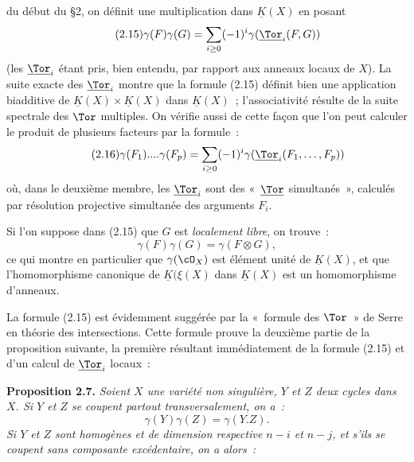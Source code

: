 du début du \S 2, on
définit une multiplication dans $\underline{K}(X)$ en posant
\begin{equation}\tag{2.15}
 \gamma(F)\gamma(G)=\sum_{i\geq0}(-1)^i\gamma(\underline{\Tor}_i(F,G))
\end{equation}
(les $\underline{\Tor}_i$ étant pris, bien entendu, par rapport aux anneaux locaux de $X$). La suite exacte des $\underline{\Tor}_i$ montre que la formule (2.15) définit bien une application biadditive de $\underline{K}(X)\times\underline{K}(X)$ dans $\underline{K}(X)$~; l'associativité résulte de la suite spectrale des $\Tor$ multiples. On vérifie aussi de cette façon que l'on peut calculer le produit de plusieurs facteurs par la formule~:
\begin{equation}\tag{2.16}
 \gamma(F_1)....\gamma(F_p)=\sum_{i\geq0}(-1)^i\gamma(\underline{\Tor}_i(F_1,\ldots,F_p))
\end{equation}
où, dans le deuxième membre, les $\underline{\Tor}_i$ sont des «~$\underline{\Tor}$ simultanés~», calculés par résolution projective simultanée des arguments $F_i$.

Si l'on suppose dans (2.15) que $G$ est \emph{localement libre}, on trouve~:
\begin{equation}\tag{2.15 bis}
 \gamma(F)\gamma(G)=\gamma(F\otimes G),
\end{equation}
ce qui montre en particulier que $\gamma(\cO_X)$ est élément unité de $\underline{K}(X)$, et que l'homomorphisme canonique de $\underline{K}(\xi(X)$ dans $\underline{K}(X)$ est un homomorphisme d'anneaux.

La formule (2.15) est évidemment suggérée par la «~formule des $\Tor$~» de Serre en théorie des intersections. Cette formule prouve la deuxième partie de la proposition suivante, la première résultant immédiatement de la formule (2.15) et d'un calcul de $\underline{\Tor}_i$ locaux~:

\textbf{Proposition 2.7.} \emph{Soient $X$ une variété non singulière, $Y$ et $Z$ deux cycles dans $X$. Si $Y$ et $Z$ se coupent partout transversalement, on a~:}
\begin{equation}\tag{2.17}
 \gamma(Y)\gamma(Z)=\gamma(Y.Z).
\end{equation}
\emph{Si $Y$ et $Z$ sont homogènes et de dimension respective $n-i$ et $n-j$, et s'ils se coupent sans composante excédentaire, on a alors~:}
